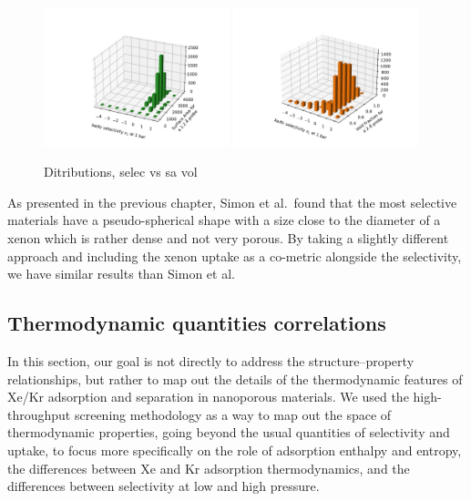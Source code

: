 \documentclass[main.tex]{subfiles}
\begin{document}
\begin{figure}[ht]
  \centering
  \includegraphics[width=0.48\textwidth]{figures/2-thermo/3D_hist_selec_SA.pdf}
  \includegraphics[width=0.48\textwidth]{figures/2-thermo/3D_hist_selec_vol.pdf}
  \caption{Ditributions, selec vs sa vol  }
\end{figure}



As presented in the previous chapter, Simon et al.\ found that the most selective materials have a pseudo-spherical shape with a size close to the diameter of a xenon which is rather dense and not very porous. By taking a slightly different approach and including the xenon uptake as a co-metric alongside the selectivity, we have similar results than Simon et al. 


\clearpage
\subsection{Thermodynamic quantities correlations}

In this section, our goal is not directly to address the structure--property relationships, but rather to map out the details of the thermodynamic features of Xe/Kr adsorption and separation in nanoporous materials. We used the high-throughput screening methodology as a way to map out the space of thermodynamic properties, going beyond the usual quantities of selectivity and uptake, to focus more specifically on the role of adsorption enthalpy and entropy, the differences between Xe and Kr adsorption thermodynamics, and the differences between selectivity at low and high pressure.
\end{document}
